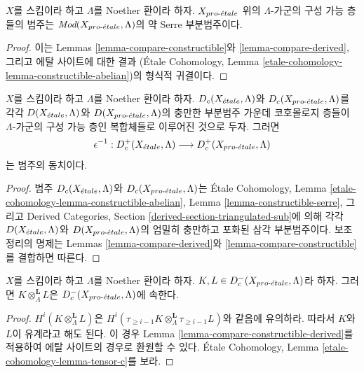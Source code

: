 \begin{lemma}
\label{lemma-constructible-serre}
$X$를 스킴이라 하고 $\Lambda$를 Noether 환이라 하자.
$X_{pro\text{-}\acute{e}tale}$ 위의 $\Lambda$-가군의 구성 가능 층들의 범주는
$\textit{Mod}(X_{pro\text{-}\acute{e}tale}, \Lambda)$의 약 Serre 부분범주이다.
\end{lemma}

\begin{proof}
이는 Lemmas \ref{lemma-compare-constructible}와
\ref{lemma-compare-derived}, 그리고 에탈 사이트에 대한 결과
(\'Etale Cohomology, Lemma
\ref{etale-cohomology-lemma-constructible-abelian})의 형식적 귀결이다.
\end{proof}

\begin{lemma}
\label{lemma-compare-constructible-derived}
$X$를 스킴이라 하고 $\Lambda$를 Noether 환이라 하자.
$D_c(X_{\acute{e}tale}, \Lambda)$와 $D_c(X_{pro\text{-}\acute{e}tale}, \Lambda)$를 각각
$D(X_{\acute{e}tale}, \Lambda)$와 $D(X_{pro\text{-}\acute{e}tale}, \Lambda)$의 충만한 부분범주
가운데 코호몰로지 층들이 $\Lambda$-가군의 구성 가능 층인 복합체들로
이루어진 것으로 두자. 그러면
$$
\epsilon^{-1} :
D_c^+(X_{\acute{e}tale}, \Lambda)
\longrightarrow
D_c^+(X_{pro\text{-}\acute{e}tale}, \Lambda)
$$
는 범주의 동치이다.
\end{lemma}

\begin{proof}
범주 $D_c(X_{\acute{e}tale}, \Lambda)$와 $D_c(X_{pro\text{-}\acute{e}tale}, \Lambda)$는
\'Etale Cohomology, Lemma
\ref{etale-cohomology-lemma-constructible-abelian}, Lemma
\ref{lemma-constructible-serre}, 그리고 Derived Categories, Section
\ref{derived-section-triangulated-sub}에 의해 각각
$D(X_{\acute{e}tale}, \Lambda)$와 $D(X_{pro\text{-}\acute{e}tale}, \Lambda)$의 엄밀히 충만하고
포화된 삼각 부분범주이다. 보조정리의 명제는 Lemmas
\ref{lemma-compare-derived}와 \ref{lemma-compare-constructible}를
결합하면 따른다.
\end{proof}

\begin{lemma}
\label{lemma-tensor-c}
$X$를 스킴이라 하고 $\Lambda$를 Noether 환이라 하자.
$K, L \in D_c^-(X_{pro\text{-}\acute{e}tale}, \Lambda)$라 하자. 그러면
$K \otimes_\Lambda^\mathbf{L} L$은 $D_c^-(X_{pro\text{-}\acute{e}tale}, \Lambda)$에
속한다.
\end{lemma}

\begin{proof}
$H^i(K \otimes_\Lambda^\mathbf{L} L)$은
$H^i(\tau_{\geq i - 1}K \otimes_\Lambda^\mathbf{L} \tau_{\geq i - 1}L)$와
같음에 유의하라. 따라서 $K$와 $L$이 유계라고 해도 된다. 이 경우
Lemma \ref{lemma-compare-constructible-derived}를 적용하여 에탈
사이트의 경우로 환원할 수 있다. \'Etale Cohomology, Lemma
\ref{etale-cohomology-lemma-tensor-c}를 보라.
\end{proof}

